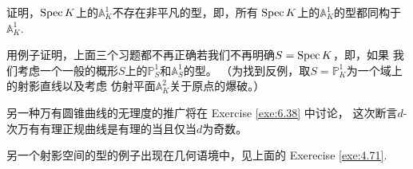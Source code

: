 \begin{exe}\label{exe:4.88}
    证明，$\operatorname{Spec} K$上的$\mathbb A_K^1$不存在非平凡的型，即，所有
    $\operatorname{Spec} K$上的$\mathbb A_K^1$的型都同构于$\mathbb A_K^1$.
\end{exe}

\begin{exe}\label{exe:4.89}
    用例子证明，上面三个习题都不再正确若我们不再明确$S=\operatorname{Spec} K$，即，如果
    我们考虑一个一般的概形$S$上的$\mathbb P_S^1$和$\mathbb A_S^1$的型。
    （为找到反例，取$S=\mathbb P_K^1$为一个域上的射影直线以及考虑
    仿射平面$\mathbb A_K^2$关于原点的爆破。）
\end{exe}

另一种万有圆锥曲线的无理度的推广将在 Exercise \ref{exe:6.38} 中讨论，
这次断言$d$-次万有有理正规曲线是有理的当且仅当$d$为奇数。

另一个射影空间的型的例子出现在几何语境中，见上面的 Exerecise \ref{exe:4.71}.